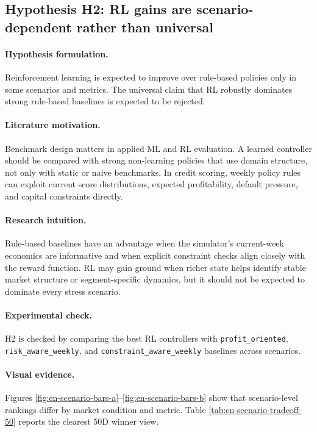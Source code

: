 \documentclass[12pt,a4paper]{article}
\begin{document}
\subsection{Hypothesis H2: RL gains are scenario-dependent rather than universal}

\paragraph{Hypothesis formulation.}
Reinforcement learning is expected to improve over rule-based policies only in some scenarios and metrics. The universal claim that RL robustly dominates strong rule-based baselines is expected to be rejected.

\paragraph{Literature motivation.}
Benchmark design matters in applied ML and RL evaluation. A learned controller should be compared with strong non-learning policies that use domain structure, not only with static or naive benchmarks. In credit scoring, weekly policy rules can exploit current score distributions, expected profitability, default pressure, and capital constraints directly.

\paragraph{Research intuition.}
Rule-based baselines have an advantage when the simulator's current-week economics are informative and when explicit constraint checks align closely with the reward function. RL may gain ground when richer state helps identify stable market structure or segment-specific dynamics, but it should not be expected to dominate every stress scenario.

\paragraph{Experimental check.}
H2 is checked by comparing the best RL controllers with \texttt{profit\_oriented}, \texttt{risk\_aware\_weekly}, and \texttt{constraint\_aware\_weekly} baselines across scenarios.

\paragraph{Visual evidence.}
Figures \ref{fig:en-scenario-bars-a}--\ref{fig:en-scenario-bars-b} show that scenario-level rankings differ by market condition and metric. Table \ref{tab:en-scenario-tradeoff-50} reports the clearest 50D winner view.
\end{document}
